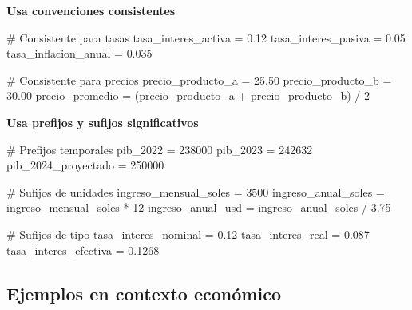 \documentclass[
  doc,
  floatsintext,
  longtable,
  a4paper,
  nolmodern,
  notxfonts,
  notimes,
  12pt,
  colorlinks=true,linkcolor=blue,citecolor=blue,urlcolor=blue]{apa7}
\newenvironment{Shaded}{\begin{snugshade}}{\end{snugshade}}
\newcommand{\CommentTok}[1]{\textcolor[rgb]{0.37,0.37,0.37}{#1}}
\newcommand{\DecValTok}[1]{\textcolor[rgb]{0.68,0.00,0.00}{#1}}
\newcommand{\FloatTok}[1]{\textcolor[rgb]{0.68,0.00,0.00}{#1}}
\newcommand{\NormalTok}[1]{\textcolor[rgb]{0.00,0.23,0.31}{#1}}
\newcommand{\OperatorTok}[1]{\textcolor[rgb]{0.37,0.37,0.37}{#1}}
\begin{document}
\textbf{Usa convenciones consistentes}

\begin{Shaded}
\begin{Highlighting}[]
\CommentTok{\# Consistente para tasas}
\NormalTok{tasa\_interes\_activa }\OperatorTok{=} \FloatTok{0.12}
\NormalTok{tasa\_interes\_pasiva }\OperatorTok{=} \FloatTok{0.05}
\NormalTok{tasa\_inflacion\_anual }\OperatorTok{=} \FloatTok{0.035}

\CommentTok{\# Consistente para precios}
\NormalTok{precio\_producto\_a }\OperatorTok{=} \FloatTok{25.50}
\NormalTok{precio\_producto\_b }\OperatorTok{=} \FloatTok{30.00}
\NormalTok{precio\_promedio }\OperatorTok{=}\NormalTok{ (precio\_producto\_a }\OperatorTok{+}\NormalTok{ precio\_producto\_b) }\OperatorTok{/} \DecValTok{2}
\end{Highlighting}
\end{Shaded}

\textbf{Usa prefijos y sufijos significativos}

\begin{Shaded}
\begin{Highlighting}[]
\CommentTok{\# Prefijos temporales}
\NormalTok{pib\_2022 }\OperatorTok{=} \DecValTok{238000}
\NormalTok{pib\_2023 }\OperatorTok{=} \DecValTok{242632}
\NormalTok{pib\_2024\_proyectado }\OperatorTok{=} \DecValTok{250000}

\CommentTok{\# Sufijos de unidades}
\NormalTok{ingreso\_mensual\_soles }\OperatorTok{=} \DecValTok{3500}
\NormalTok{ingreso\_anual\_soles }\OperatorTok{=}\NormalTok{ ingreso\_mensual\_soles }\OperatorTok{*} \DecValTok{12}
\NormalTok{ingreso\_anual\_usd }\OperatorTok{=}\NormalTok{ ingreso\_anual\_soles }\OperatorTok{/} \FloatTok{3.75}

\CommentTok{\# Sufijos de tipo}
\NormalTok{tasa\_interes\_nominal }\OperatorTok{=} \FloatTok{0.12}
\NormalTok{tasa\_interes\_real }\OperatorTok{=} \FloatTok{0.087}
\NormalTok{tasa\_interes\_efectiva }\OperatorTok{=} \FloatTok{0.1268}
\end{Highlighting}
\end{Shaded}

\subsection{Ejemplos en contexto
económico}\label{ejemplos-en-contexto-econuxf3mico}
\end{document}
